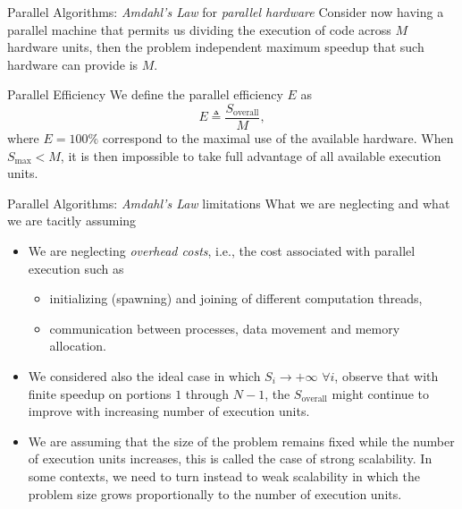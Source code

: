 \documentclass{beamer}
\begin{document}
\begin{frame}{Parallel Algorithms: \emph{Amdahl's Law} for \emph{parallel hardware}}
 Consider now having a parallel machine that permits us dividing the execution of code across $M$ hardware units, then the problem independent maximum speedup that such hardware can provide is $M$.
 \begin{block}{Parallel Efficiency}
 We define the parallel efficiency $E$ as
 \begin{equation*}
 	E \triangleq \frac{S_{\text{overall}}}{M},
 \end{equation*}
 where $E = 100\%$ correspond to the maximal use of the available hardware. When $S_{\text{max}} < M$, it is then impossible to take full advantage of all available execution units.
 \end{block}

 
\end{frame}

\begin{frame}{Parallel Algorithms: \emph{Amdahl's Law} limitations}
What we are neglecting and what we are tacitly assuming
\begin{itemize}
	\item We are neglecting \emph{overhead costs}, i.e., the cost associated with parallel execution such as
	\begin{itemize}
		\item initializing (spawning) and joining of different computation threads,
		\item communication between processes, data movement and memory allocation.
	\end{itemize}
	\item We considered also the ideal case in which $S_i \rightarrow +\infty$ $\forall i$, observe that with finite speedup on portions $1$ through $N-1$, the $S_{\text{overall}}$ might continue to improve with increasing number of execution units.
	\item We are assuming that the size of the problem remains fixed while the number of execution units increases, this is called the case of \alert{strong scalability}. In some contexts, we need to turn instead to \alert{weak scalability} in which the problem size grows proportionally to the number of execution units.
\end{itemize}
\end{frame}
\end{document}
